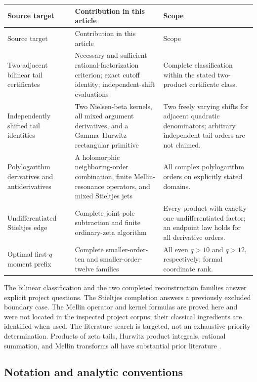 \documentclass[11pt,letterpaper]{article}
\numberwithin{equation}{section}
\theoremstyle{definition}
\theoremstyle{remark}
\begin{document}
\begin{longtable}{@{}>{\raggedright\arraybackslash}p{}>{\raggedright\arraybackslash}p{}>{\raggedright\arraybackslash}p{}@{}}
\toprule
Source target & Contribution in this article & Scope\\
\midrule\endfirsthead
\toprule Source target & Contribution in this article & Scope\\\midrule\endhead
Two adjacent bilinear tail certificates \cite{tail-alternating}
& Necessary and sufficient rational-factorization criterion; exact
cutoff identity; independent-shift evaluations
& Complete classification within the stated two-product certificate class.\\[5pt]
Independently shifted tail identities
& Two Nielsen-beta kernels, all mixed argument derivatives, and a
Gamma--Hurwitz rectangular primitive
& Two freely varying shifts for adjacent quadratic denominators;
arbitrary independent tail orders are not claimed.\\[5pt]
Polylogarithm derivatives and antiderivatives
& A holomorphic neighboring-order combination, finite Mellin-resonance
operators, and mixed Stieltjes jets
& All complex polylogarithm orders on explicitly stated domains.\\[5pt]
Undifferentiated Stieltjes edge \cite{tail-polygamma}
& Complete joint-pole subtraction and finite ordinary-zeta algorithm
& Every product with exactly one undifferentiated factor; an endpoint
law holds for all derivative orders.\\[5pt]
Optimal first-$q$ moment prefix \cite{tail-alternating,tail-quartic}
& Complete smaller-order-ten and smaller-order-twelve families
& All even $q>10$ and $q>12$, respectively; formal coordinate rank.\\
\bottomrule
\end{longtable}

The bilinear classification and the two completed reconstruction families
answer explicit project questions. The Stieltjes completion answers a
previously excluded boundary case. The Mellin operator and kernel formulas
are proved here and were not located in the inspected project corpus;
their classical ingredients are identified when used. The literature
search is targeted, not an exhaustive priority determination. Products
of zeta tails, Hurwitz product integrals, rational summation, and Mellin
transforms all have substantial prior literature
\cite{Hoffman,EspinosaMoll,ShpotParis,DLMFPolylog}.

\subsection{Notation and analytic conventions}
\end{document}
